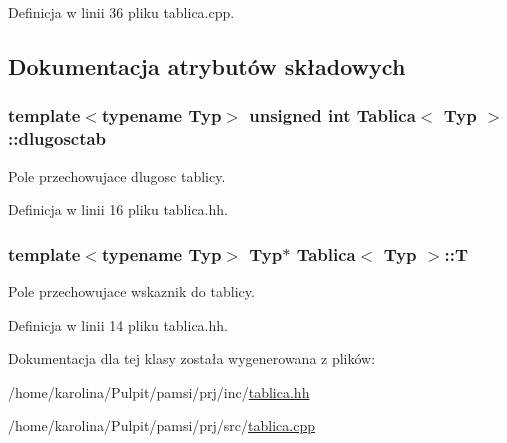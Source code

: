 Definicja w linii 36 pliku tablica.\-cpp.



\subsection{Dokumentacja atrybutów składowych}
\hypertarget{class_tablica_a42b49425f0e086c4e958337dcba3a3b6}{
\subsubsection[{dlugosctab}]{\setlength{\rightskip}{0pt plus 5cm}template$<$typename Typ$>$ unsigned int {\bf Tablica}$<$ Typ $>$\-::dlugosctab}}\label{class_tablica_a42b49425f0e086c4e958337dcba3a3b6}


Pole przechowujace dlugosc tablicy. 



Definicja w linii 16 pliku tablica.\-hh.

\hypertarget{class_tablica_a8a186bd43f434e2c8b58377f6a54ab47}{
\subsubsection[{T}]{\setlength{\rightskip}{0pt plus 5cm}template$<$typename Typ$>$ Typ$\ast$ {\bf Tablica}$<$ Typ $>$\-::T}}\label{class_tablica_a8a186bd43f434e2c8b58377f6a54ab47}


Pole przechowujace wskaznik do tablicy. 



Definicja w linii 14 pliku tablica.\-hh.



Dokumentacja dla tej klasy została wygenerowana z plików\-:\begin{DoxyCompactItemize}
\item 
/home/karolina/\-Pulpit/pamsi/prj/inc/\hyperlink{tablica_8hh}{tablica.\-hh}\item 
/home/karolina/\-Pulpit/pamsi/prj/src/\hyperlink{tablica_8cpp}{tablica.\-cpp}\end{DoxyCompactItemize}
